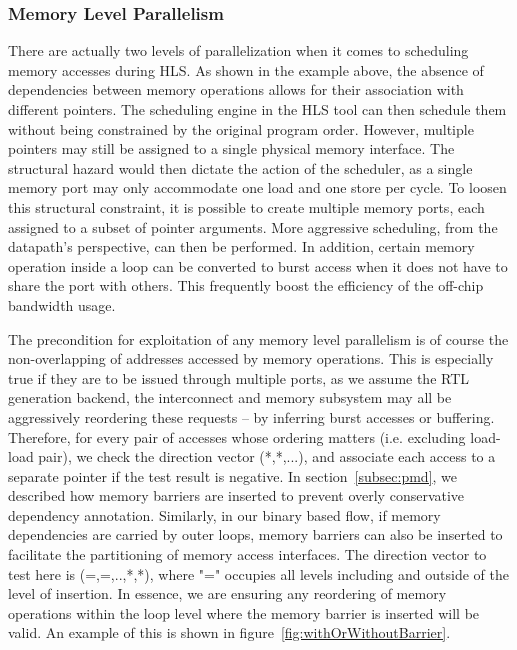 \subsubsection{Memory Level Parallelism}
\label{subsec:mlp}
There are actually two levels of parallelization when it comes to scheduling memory accesses during HLS. As shown in the example above, the absence of dependencies between memory operations allows for their association with
different pointers. The scheduling engine in the HLS tool can then schedule
them without being constrained by the original program order. However, multiple pointers may still be assigned to a single physical memory  interface. The structural hazard would then dictate the action of the scheduler,
as a single memory port may only accommodate one load and one store per cycle.
To loosen this structural constraint, it is possible to create multiple memory
ports, each assigned to a subset of pointer arguments. More aggressive scheduling, from the datapath's perspective, can then be performed. In addition, certain memory operation inside a loop can be converted to burst
access when it does not have to share the port with others. This frequently boost the efficiency of the off-chip bandwidth usage.


The precondition for exploitation of any memory level parallelism is of course the non-overlapping of addresses accessed by memory operations. This is especially true if they are to be issued through multiple ports, 
as we assume the RTL generation backend, the interconnect and memory subsystem may all be aggressively reordering these requests -- by inferring burst accesses or buffering. Therefore, for every pair of accesses whose ordering matters (i.e. excluding load-load pair), we check the direction vector (*,*,...), and associate each access to a separate
pointer if the test result is negative. In section~\ref{subsec:pmd}, we described how memory barriers are inserted to prevent overly conservative dependency annotation.
Similarly, in our binary based flow, if memory dependencies are carried by outer loops,
memory barriers can also be inserted to facilitate the partitioning of memory access interfaces. The direction vector to test here is  (=,=,..,*,*),
where "=" occupies all levels including and outside of the level of insertion. In essence, we are ensuring any reordering of memory operations within the loop level where the memory barrier is inserted will be valid. An example of this is shown in figure~\ref{fig:withOrWithoutBarrier}. 



